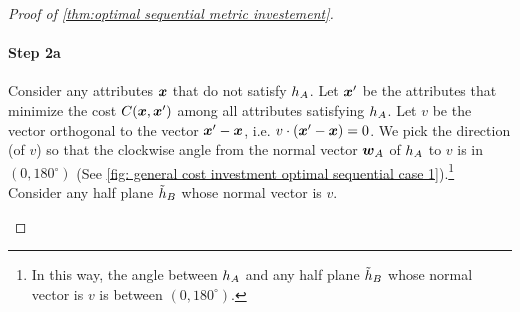 \begin{proof}[Proof of \cref{thm:optimal sequential metric investement}]
    \paragraph{Step 2a}
    Consider any attributes $\boldsymbol{x}$ that do not satisfy $h_A$. Let $\boldsymbol{x}'$ be the attributes that minimize the cost $C(\boldsymbol{x},\boldsymbol{x}')$ among all attributes satisfying $h_A$.
    Let $v$ be the vector orthogonal to the vector $\boldsymbol{x}' - \boldsymbol{x}$, i.e. $v \cdot (\boldsymbol{x}' - \boldsymbol{x}) = 0$.
    We pick the direction (of $v$) so that the clockwise angle from the normal vector $\boldsymbol{w}_A$ of $h_A$ to $v$ is in $(0, 180^{\circ})$ (See \cref{fig: general cost investment optimal sequential case 1}).\footnote{In this way, the angle between $h_A$ and 
 any half plane $\tilde {h}_B$ whose normal vector is $v$ is between $(0,180^{\circ})$.} 
 Consider any half plane $\tilde {h}_B$ whose normal vector is $v$. %


\begin{figure}[t]
\centering
{}
\end{figure}
\end{proof}
